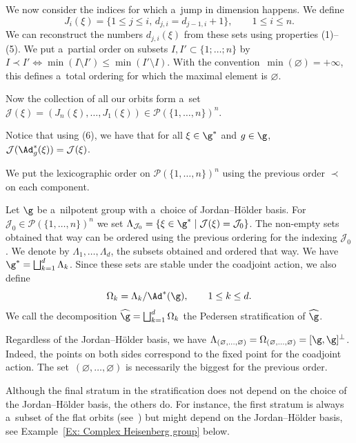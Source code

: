 We now consider the indices for which a~jump in dimension happens. We define
\[J_i(\xi) = \{1\leq j \leq i,\, d_{j,i} = d_{j-1,i} +1 \},\qquad 1\leq i \leq n.\]
We can reconstruct the numbers $d_{j,i}(\xi)$ from these sets using properties (1)--(5). We put a~partial order on subsets $I, I' \subset \{1;\dots;n\}$ by $I\prec I' \Leftrightarrow \min(I\setminus I') \leq \min(I' \setminus I)$.
With the convention~${\min(\varnothing) = +\infty}$, this defines a~total ordering for which the maximal element is $\varnothing$.

Now the collection of all our orbits form a~set $\mathcal{J}(\xi)= (J_n(\xi),\dots,J_1(\xi)) \in \mathcal{P}(\{1,\dots,n\})^n$.

Notice that using (6), we have that for all $\xi \in \g^*$ and $g\in \g$, $\mathcal{J}(\Ad^*_g(\xi)) = \mathcal{J}(\xi)$.

We put the lexicographic order on $\mathcal{P}(\{1,\dots,n\})^n$ using the previous order $\prec$ on each component.

\begin{mydef}
 Let $\g$ be a~nilpotent group with a~choice of Jordan--H\"older basis. For $\mathcal{J}_0 \in \mathcal{P}(\{1,\dots,n\})^n$ we set $\Lambda_{\mathcal{J}_0} = \{\xi \in \g^* \mid \mathcal{J}(\xi) = \mathcal{J}_0\}$. The non-empty sets obtained that way can be ordered using the previous ordering for the indexing $\mathcal{J}_0$. We denote by $\Lambda_1, \dots, \Lambda_d$,
 the subsets obtained and ordered that way. We have $\g^* = \bigsqcup_{k = 1}^d \Lambda_k$. Since these sets are stable under the coadjoint action, we also define
 \[\Omega_k =  {\Lambda_k}/{\Ad^*(\g)},\qquad 1\leq k \leq d.\]
 We call the decomposition $\widehat{\g} = \bigsqcup_{k = 1}^d \Omega_k$ the Pedersen stratification of $\widehat{\g}$.
\end{mydef}

\begin{ex}
 Regardless of the Jordan--H\"older basis, we have $\Lambda_{(\varnothing,\dots,\varnothing)} = \Omega_{(\varnothing,\dots,\varnothing)} = [\g,\g]^{\perp}$.
 Indeed, the points on both sides correspond to the fixed point for the coadjoint action. The set~${(\varnothing,\dots,\varnothing)}$ is necessarily the biggest for the previous order.
\end{ex}

\begin{rem}
 Although the final stratum in the stratification does not depend on the choice of the Jordan--H\"older basis, the others do. For instance, the first stratum is always a~subset of the flat orbits (see~\cite{GoffengKuzmin}) but might depend on the Jordan--H\"older basis, see Example~\ref{Ex: Complex Heisenberg group} below.
\end{rem}

